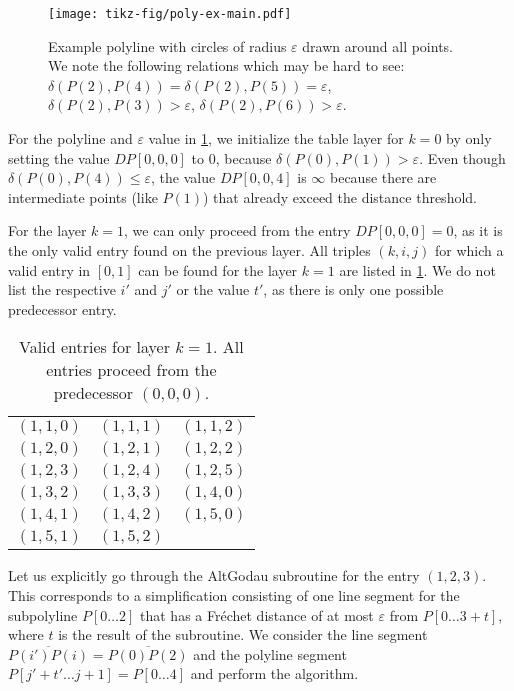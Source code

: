 \begin{figure}
  \centering
  \texttt{[image: tikz-fig/poly-ex-main.pdf]}
  \caption{Example polyline with circles of radius \(\varepsilon\) drawn around all points. We note the following relations which may be hard to see: \(\delta(P(2), P(4)) = \delta(P(2), P(5)) = \varepsilon\), \(\delta(P(2), P(3)) > \varepsilon\), \(\delta(P(2), P(6)) > \varepsilon\).}
  \label{fig:poly-ex-main}
\end{figure}

For the polyline and \(\varepsilon\) value in \cref{fig:poly-ex-main}, we initialize the table layer for \(k = 0\) by only setting the value \(DP[0,0,0]\) to \(0\), because \(\delta(P(0), P(1)) > \varepsilon\). Even though \(\delta(P(0), P(4)) \leq \varepsilon\), the value \(DP[0,0,4]\) is \(\infty\) because there are intermediate points (like \(P(1)\)) that already exceed the distance threshold.

For the layer \(k = 1\), we can only proceed from the entry \(DP[0,0,0] = 0\), as it is the only valid entry found on the previous layer. All triples \((k, i, j)\) for which a valid entry in \([0, 1]\) can be found for the layer \(k = 1\) are listed in \cref{tab:exlayer1}. We do not list the respective \(i'\) and \(j'\) or the value \(t'\), as there is only one possible predecessor entry.
\begin{table}[ht]
\centering
\begin{tabular}{|ccc|}
\hline
$(1,1,0)$ & $(1,1,1)$ & $(1,1,2)$ \\
$(1,2,0)$ & $(1,2,1)$ & $(1,2,2)$ \\
$(1,2,3)$ & $(1,2,4)$ & $(1,2,5)$ \\
$(1,3,2)$ & $(1,3,3)$ & $(1,4,0)$ \\
$(1,4,1)$ & $(1,4,2)$ & $(1,5,0)$ \\
$(1,5,1)$ & $(1,5,2)$ & \\
\hline
\end{tabular}
\caption{Valid entries for layer \(k = 1\). All entries proceed from the predecessor \((0,0,0)\).}
\label{tab:exlayer1}
\end{table}

Let us explicitly go through the AltGodau subroutine for the entry \((1, 2, 3)\). This corresponds to a simplification consisting of one line segment for the subpolyline \(P[0\dots 2]\) that has a Fréchet distance of at most \(\varepsilon\) from \(P[0 \dots 3 + t]\), where \(t\) is the result of the subroutine. We consider the line segment \(\overline{P(i')P(i)} = \overline{P(0)P(2)}\) and the polyline segment \(P[j' + t' \dots j + 1] = P[0 \dots 4]\) and perform the algorithm.

